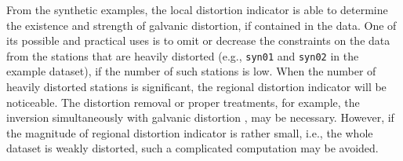 From the synthetic examples, the local distortion indicator is able to determine the existence and strength of galvanic distortion, if contained in the data.
%
One of its possible and practical uses is to omit or decrease the constraints on the data from the stations that are heavily distorted (e.g., \texttt{syn01} and \texttt{syn02} in the example dataset), if the number of such stations is low.
%
When the number of heavily distorted stations is significant, the regional distortion indicator will be noticeable. The distortion removal or proper treatments, for example, the inversion simultaneously with galvanic distortion \citep[e.g.,][]{sasaki2006a, avdeeva2015a}, may be necessary.
%
However, if the magnitude of regional distortion indicator is rather small, i.e., the whole dataset is weakly distorted, such a complicated computation may be avoided.

\begin{comment}
\begin{itemize}
	\item \blue{Additional issues}
	\item \red{As shown in Fig. 25, the regional gamma becomes to be real-valued and frequency independent as a whole, even if local gamma at each site may be complex-valued
and frequency dependent. From this , we can decide whether the dataset is consistent with the assumed setting (regional structure well covered by the observation array + galvanic distorters).
If the regional 3D structure is not well covered, you will have complex-valued and frequency dependent regional gamma.}
\end{itemize}
\end{comment}



